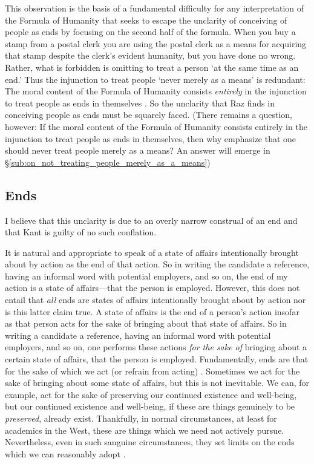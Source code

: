 \documentclass[12pt]{article}
\begin{document}
This observation is the basis of a fundamental difficulty for any interpretation of the Formula of Humanity that seeks to escape the unclarity of conceiving of people as ends by focusing on the second half of the formula. When you buy a stamp from a postal clerk you are using the postal clerk as a means for acquiring that stamp despite the clerk's evident humanity, but you have done no wrong. Rather, what is forbidden is omitting to treat a person `at the same time as an end.' Thus the injunction to treat people `never merely as a means' is redundant: The moral content of the Formula of Humanity consists \emph{entirely} in the injunction to treat people as ends in themselves \citep[for further criticism of attempts to derive moral content from the prohibition to treat people merely as a means see][]{Parfit:2008lr}. So the unclarity that Raz finds in conceiving people as ends must be squarely faced. (There remains a question, however: If the moral content of the Formula of Humanity consists entirely in the injunction to treat people as ends in themselves, then why emphasize that one should never treat people merely as a means? An answer will emerge in \S \ref{sub:on_not_treating_people_merely_as_a_means})

\subsection{Ends} \label{sub:ends} %

I believe that this unclarity is due to an overly narrow construal of an end and that Kant is guilty of no such conflation. %

It is natural and appropriate to speak of a state of affairs intentionally brought about by action as the end of that action. So in writing the candidate a reference, having an informal word with potential employers, and so on, the end of my action is a state of affairs---that the person is employed. However, this does not entail that \emph{all} ends are states of affairs intentionally brought about by action nor is this latter claim true. A state of affairs is the end of a person's action insofar as that person acts for the sake of bringing about that state of affairs. So in writing a candidate a reference, having an informal word with potential employers, and so on, one performs these actions \emph{for the sake of} bringing about a certain state of affairs, that the person is employed. Fundamentally, ends are that for the sake of which we act (or refrain from acting) \citep[see, inter alia,][]{Velleman:2006nx}. Sometimes we act for the sake of bringing about some state of affairs, but this is not inevitable. We can, for example, act for the sake of preserving our continued existence and well-being, but our continued existence and well-being, if these are things genuinely to be \emph{preserved}, already exist. Thankfully, in normal circumstances, at least for academics in the West, these are things which we need not actively pursue. Nevertheless, even in such sanguine circumstances, they set limits on the ends which we can reasonably adopt \citep[see][88-94]{Korsgaard:1996md}. 
\end{document}
